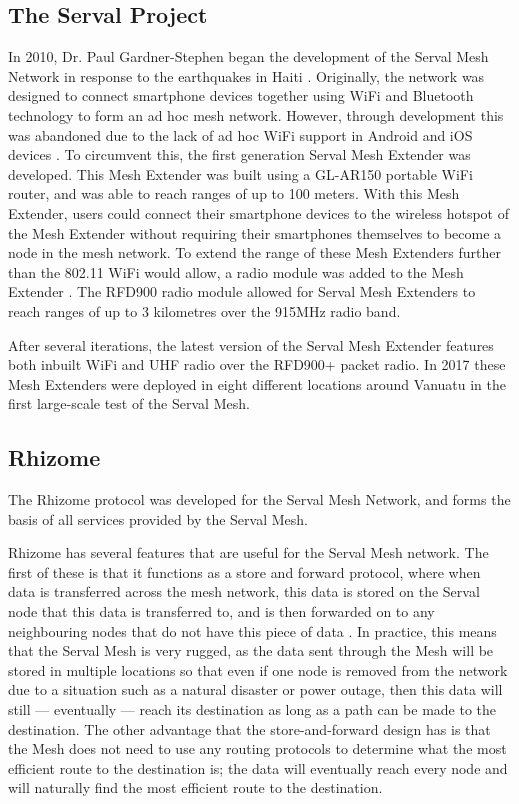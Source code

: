 \subsection{The Serval Project}
In 2010, Dr. Paul Gardner-Stephen began the development of the Serval Mesh Network in response to the earthquakes in Haiti \parencite{servalProject2011}.
Originally, the network was designed to connect smartphone devices together using WiFi and Bluetooth technology to form an ad hoc mesh network.
However, through development this was abandoned due to the lack of ad hoc WiFi support in Android and iOS devices \parencite{productizingServalMesh}.
To circumvent this, the first generation Serval Mesh Extender was developed.
This Mesh Extender was built using a GL-AR150 portable WiFi router, and was able to reach ranges of up to 100 meters.
With this Mesh Extender, users could connect their smartphone devices to the wireless hotspot of the Mesh Extender without requiring their smartphones themselves to become a node in the mesh network.
To extend the range of these Mesh Extenders further than the 802.11 WiFi would allow, a radio module was added to the Mesh Extender \parencite{productizingServalMesh}.
The RFD900 radio module allowed for Serval Mesh Extenders to reach ranges of up to 3 kilometres over the 915MHz radio band.


After several iterations, the latest version of the Serval Mesh Extender features both inbuilt WiFi and UHF radio over the RFD900+ packet radio.
In 2017 these Mesh Extenders were deployed in eight different locations around Vanuatu in the first large-scale test of the Serval Mesh.
\parencite{pilotingServalMesh}


\subsection{Rhizome}
The Rhizome protocol was developed for the Serval Mesh Network, and forms the basis of all services provided by the Serval Mesh.

Rhizome has several features that are useful for the Serval Mesh network.
The first of these is that it functions as a store and forward protocol, where when data is transferred across the mesh network, this data is stored on the Serval node that this data is transferred to, and is then forwarded on to any neighbouring nodes that do not have this piece of data \parencite{servalProject2011}.
In practice, this means that the Serval Mesh is very rugged, as the data sent through the Mesh will be stored in multiple locations so that even if one node is removed from the network due to a situation such as a natural disaster or power outage, then this data will still — eventually — reach its destination as long as a path can be made to the destination.
The other advantage that the store-and-forward design has is that the Mesh does not need to use any routing protocols to determine what the most efficient route to the destination is; the data will eventually reach every node and will naturally find the most efficient route to the destination. 

